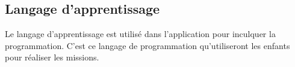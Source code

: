 


\subsection{Langage d'apprentissage}
Le langage d'apprentissage est utilisé dans l'application pour inculquer la programmation. C'est ce langage de programmation qu'utiliseront les enfants pour réaliser les missions.

